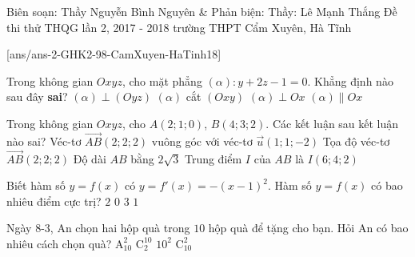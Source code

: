 
\begin{name}
{Biên soạn: Thầy Nguyễn Bình Nguyên \& Phản biện: Thầy: Lê Mạnh Thắng}
{Đề thi thử THQG lần 2, 2017 - 2018 trường THPT Cẩm Xuyên, Hà Tĩnh}
\end{name}
\setcounter{ex}{0}
[ans/ans-2-GHK2-98-CamXuyen-HaTinh18]
\begin{ex}%
	 Trong không gian $Oxyz$, cho mặt phẳng $(\alpha) \colon y+2z-1=0$. Khẳng định nào sau đây \textbf{sai}?
	\choice 
	{ $ (\alpha) \perp (Oyz) $}
	{ $(\alpha)$ cắt $(Oxy) $}
	{ \True $ (\alpha) \perp Ox $}
	{ $(\alpha)  \parallel Ox $}
\end{ex}
\begin{ex}%
	 Trong không gian $Oxyz$, cho $A(2;1;0)$, $B(4;3;2)$. Các kết luận sau kết luận nào sai?
	\choice 
	{ Véc-tơ $ \vec{AB} (2;2;2) $ vuông góc với véc-tơ $\vec{u}(1;1;-2)$} 
	{ Tọa độ véc-tơ $\vec{AB}(2;2;2)$} 
	{ Độ dài $AB$ bằng $2\sqrt{3}$} 
	{ \True Trung điểm $I$ của $AB$ là $I(6;4;2)$}
\end{ex}
\begin{ex}%
	 Biết hàm số $y=f(x)$ có $y=f'(x)=-(x-1)^2$. Hàm số $y=f(x)$ có bao nhiêu điểm cực trị?
	\choice 
	{ $2$}
	{\True $0$}
	{ $3$}
	{ $1$}
\end{ex}
\begin{ex}%
	 Ngày 8-3, An chọn hai hộp quà trong $10$ hộp quà để tặng cho bạn. Hỏi An có bao nhiêu cách chọn quà?
	\choice 
	{ $\mathrm{A}_{10}^2$}
	{ $\mathrm{C}_2^{10}$}
	{ $10^2$}
	{\True $\mathrm{C}_{10}^2$}
\end{ex}
